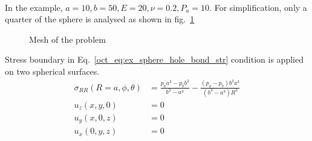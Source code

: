 \paragraph{}
In the example, $a = 10,b = 50, E=20,\nu = 0.2,P_a = 10$. For simplification, only a quarter of the sphere is analysed as shown in fig.~\ref{oct_fig:ex_hollow_sphere_meshP}

\begin{figure}[h!]
  \centering
  \caption{Mesh of the problem}
  \label{oct_fig:ex_hollow_sphere_meshP}
\end{figure}

Stress boundary in Eq.~\ref{oct_eq:ex_sphere_hole_bond_str} condition is applied on two spherical surfaces.
\begin{subequations}
    \begin{align}
    \sigma_{RR}(R=a,\phi,\theta) & = \frac{p_aa^3-p_bb^3}{b^3-a^3} - \frac{(p_a-p_b)b^3a^3}{(b^3-a^3)R^3}\\
    u_z(x,y,0) &= 0\\
    u_y(x,0,z) & = 0 \\
    u_x(0,y,z) & = 0
  \end{align}
\label{oct_eq:ex_sphere_hole_bond_str}
\end{subequations}

